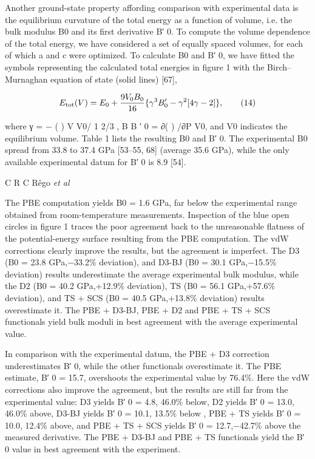 \documentclass{article}
\begin{document}
Another ground-state property affording comparison with experimental data is the equilibrium curvature of the total energy as a function of volume, i.e. the bulk modulus B0 and its first derivative B′ 0. To compute the volume dependence of the total energy, we have considered a set of equally spaced volumes, for each of which a and c were optimized. To calculate B0 and B′ 0, we have fitted the symbols representing the calculated total energies in figure 1 with the Birch–Murnaghan equation of state (solid lines) [67],

$$E_{\rm tot}(V)=E_{0}+\frac{9V_{0}B_{0}}{16}\{\gamma^{3}B_{0}^{\prime}-\gamma^{2}[4\gamma-2]\},\tag{14}$$

where γ = − ( ) V V0/ 1 2/3 , B B ′ 0 = ∂( ) /∂P V0, and V0 indicates the equilibrium volume. Table 1 lists the resulting B0 and B′ 0. The experimental B0 spread from 33.8 to 37.4 GPa [53–55, 68] (average 35.6 GPa), while the only available experimental datum for B′ 0 is 8.9 [54].

C R C Rêgo \textit{et al}

The PBE computation yields B0 = 1.6 GPa, far below the experimental range obtained from room-temperature measurements. Inspection of the blue open circles in figure 1 traces the poor agreement back to the unreasonable flatness of the potential-energy surface resulting from the PBE computation. The vdW corrections clearly improve the results, but the agreement is imperfect. The D3 (B0 = 23.8 GPa,−33.2\% deviation), and D3-BJ (B0 = 30.1 GPa,−15.5\% deviation) results underestimate the average experimental bulk modulus, while the D2 (B0 = 40.2 GPa,+12.9\% deviation), TS (B0 = 56.1 GPa,+57.6\% deviation), and TS + SCS (B0 = 40.5 GPa,+13.8\% deviation) results overestimate it. The PBE + D3-BJ, PBE + D2 and PBE + TS + SCS functionals yield bulk moduli in best agreement with the average experimental value.

In comparison with the experimental datum, the PBE + D3 correction underestimates B′ 0, while the other functionals overestimate it. The PBE estimate, B′ 0 = 15.7, overshoots the experimental value by 76.4\%. Here the vdW corrections also improve the agreement, but the results are still far from the experimental value: D3 yields B′ 0 = 4.8, 46.0\% below, D2 yields B′ 0 = 13.0, 46.0\% above, D3-BJ yields B′ 0 = 10.1, 13.5\% below , PBE + TS yields B′ 0 = 10.0, 12.4\% above, and PBE + TS + SCS yields B′ 0 = 12.7,−42.7\% above the measured derivative. The PBE + D3-BJ and PBE + TS functionals yield the B′ 0 value in best agreement with the experiment.
\end{document}
